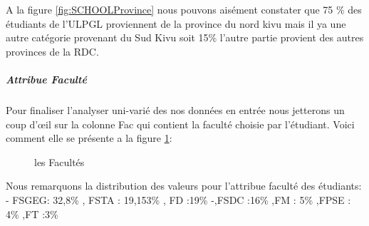 A la figure \ref{fig:SCHOOLProvince} nous pouvons aisément constater que 75 \% des étudiants
de l'\ac{ULPGL} proviennent de la province du nord kivu mais il ya une autre
catégorie provenant  du Sud Kivu soit 15\% l'autre partie provient des autres provinces de la \ac{RDC}.
\subparagraph{Attribue Faculté}
Pour finaliser l'analyser uni-varié des nos données en entrée nous jetterons un coup d'œil sur la colonne Fac qui contient la faculté choisie par l'étudiant.
Voici comment elle se présente a la figure \ref{fig:FAC}:
\begin{figure}[!htbp]
	\centering
	\caption{les Facultés }
	\label{fig:FAC}
\end{figure}
 Nous remarquons la distribution des valeurs pour
l'attribue faculté des étudiants: - FSGEG: 32,8\% , FSTA : 19,153\% , FD
:19\% -,FSDC :16\% ,FM : 5\% ,FPSE : 4\% ,FT :3\%
